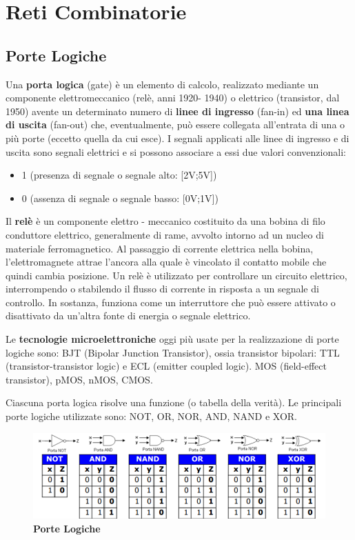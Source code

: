 \documentclass[12pt]{article} %
\begin{document}
\newpage
\section{Reti Combinatorie}
\subsection{Porte Logiche}
Una \textbf{porta logica} (gate) è un elemento di calcolo, realizzato mediante un componente elettromeccanico (relè, anni 1920- 1940) o elettrico (transistor, dal 1950) avente un determinato numero di \textbf{linee di ingresso }(fan-in) ed \textbf{una linea di uscita }(fan-out) che, eventualmente, può essere collegata all’entrata di una o più porte (eccetto quella da cui esce). I segnali applicati alle linee di ingresso e di uscita sono segnali elettrici e si possono associare a essi due valori convenzionali:
\begin{itemize}
    \item 1 (presenza di segnale o segnale alto: [2V;5V])
    \item 0 (assenza di segnale o segnale basso: [0V;1V])
\end{itemize}
\par\medskip\noindent
Il \textbf{relè} è un componente elettro - meccanico costituito da una bobina di filo conduttore elettrico, generalmente di rame, avvolto intorno ad un nucleo di materiale ferromagnetico. Al passaggio di corrente elettrica nella bobina, l'elettromagnete attrae l'ancora alla quale è vincolato il contatto mobile che quindi cambia posizione. Un relè è utilizzato per controllare un circuito elettrico, interrompendo o stabilendo il flusso di corrente in risposta a un segnale di controllo. In sostanza, funziona come un interruttore che può essere attivato o disattivato da un'altra fonte di energia o segnale elettrico.\par\medskip\noindent
Le\textbf{ tecnologie microelettroniche} oggi più usate per la realizzazione di porte logiche sono: BJT (Bipolar Junction Transistor), ossia transistor bipolari: TTL (transistor-transistor logic) e ECL (emitter coupled logic). MOS (field-effect transistor), pMOS, nMOS, CMOS.\par\medskip\noindent
Ciascuna porta logica risolve una funzione (o tabella della verità). Le principali porte logiche utilizzate sono: NOT, OR, NOR, AND, NAND e XOR.\par\medskip\noindent
\begin{figure}[h]
    \centering
    \includegraphics[width=1\linewidth]{Porte Logiche.png}
    \caption{\textbf{Porte Logiche}}
\end{figure}
\end{document}

